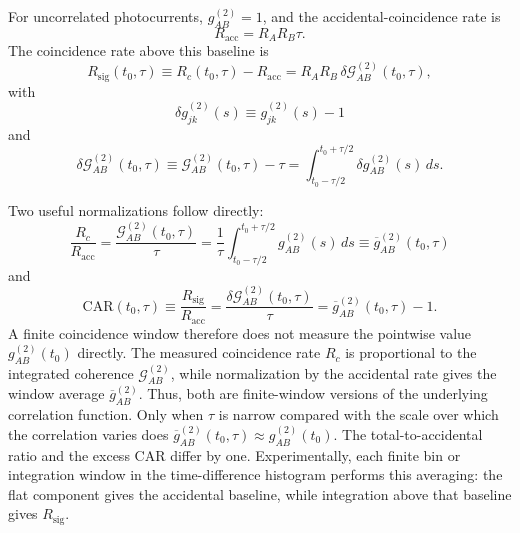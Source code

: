 \documentclass[a4paper,10pt]{article}
\begin{document}
For uncorrelated photocurrents, $g^{(2)}_{AB}=1$, and the accidental-coincidence rate is
\begin{equation}
    \label{eq:accidental-rate}
    R_{\mathrm{acc}}=R_A R_B\tau.
\end{equation}
The coincidence rate above this baseline is
\begin{equation}
    \label{eq:signal-rate}
    R_{\mathrm{sig}}(t_0,\tau)
    \equiv R_c(t_0,\tau)-R_{\mathrm{acc}}
    =R_A R_B\,\delta\mathcal{G}^{(2)}_{AB}(t_0,\tau),
\end{equation}
with
\begin{equation}
    \delta g^{(2)}_{jk}(s)\equiv g^{(2)}_{jk}(s)-1
\end{equation}
and
\begin{equation}
    \delta\mathcal{G}^{(2)}_{AB}(t_0,\tau)
    \equiv\mathcal{G}^{(2)}_{AB}(t_0,\tau)-\tau
    =\int_{t_0-\tau/2}^{t_0+\tau/2}\delta g^{(2)}_{AB}(s)\,ds.
\end{equation}

Two useful normalizations follow directly:
\begin{equation}
    \label{eq:window-averaged-coherence}
    \frac{R_c}{R_{\mathrm{acc}}}
    =\frac{\mathcal{G}^{(2)}_{AB}(t_0,\tau)}{\tau}
    =\frac{1}{\tau}
     \int_{t_0-\tau/2}^{t_0+\tau/2}g^{(2)}_{AB}(s)\,ds
    \equiv\overline{g}^{(2)}_{AB}(t_0,\tau)
\end{equation}
and
\begin{equation}
    \label{eq:car}
    \mathrm{CAR}(t_0,\tau)
    \equiv\frac{R_{\mathrm{sig}}}{R_{\mathrm{acc}}}
    =\frac{\delta\mathcal{G}^{(2)}_{AB}(t_0,\tau)}{\tau}
    =\overline{g}^{(2)}_{AB}(t_0,\tau)-1.
\end{equation}
A finite coincidence window therefore does not measure the pointwise value $g^{(2)}_{AB}(t_0)$ directly.  The measured coincidence rate $R_c$ is proportional to the integrated coherence $\mathcal{G}^{(2)}_{AB}$, while normalization by the accidental rate gives the window average $\overline{g}^{(2)}_{AB}$.  Thus, both are finite-window versions of the underlying correlation function.  Only when $\tau$ is narrow compared with the scale over which the correlation varies does $\overline{g}^{(2)}_{AB}(t_0,\tau)\approx g^{(2)}_{AB}(t_0)$.  The total-to-accidental ratio and the excess CAR differ by one.  Experimentally, each finite bin or integration window in the time-difference histogram performs this averaging: the flat component gives the accidental baseline, while integration above that baseline gives $R_{\mathrm{sig}}$.
\end{document}
